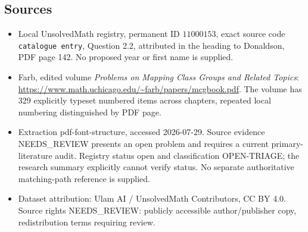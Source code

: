 \documentclass[11pt]{article}
\begin{document}
\subsection{Sources}
\begin{itemize}
\item Local UnsolvedMath registry, permanent ID \(11000153\), exact source code \texttt{catalogue entry}, Question 2.2, attributed in the heading to Donaldson, PDF page 142. No proposed year or first name is supplied.
\item Farb, edited volume \emph{Problems on Mapping Class Groups and Related Topics}: \url{https://www.math.uchicago.edu/~farb/papers/mcgbook.pdf}. The volume has 329 explicitly typeset numbered items across chapters, repeated local numbering distinguished by PDF page.
\item Extraction pdf-font-structure, accessed 2026-07-29. Source evidence NEEDS\_REVIEW presents an open problem and requires a current primary-literature audit. Registry status open and classification OPEN-TRIAGE; the research summary explicitly cannot verify status. No separate authoritative matching-path reference is supplied.
\item Dataset attribution: Ulam AI / UnsolvedMath Contributors, CC BY 4.0. Source rights NEEDS\_REVIEW: publicly accessible author/publisher copy, redistribution terms requiring review.
\end{itemize}
\end{document}
